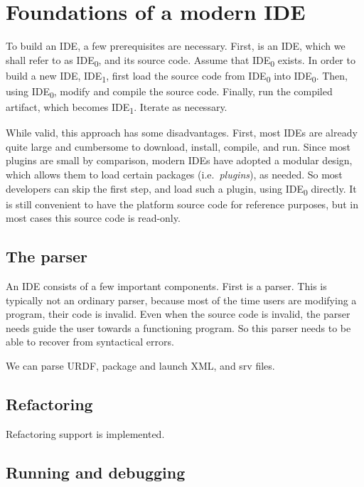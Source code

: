 \documentclass[12pt,initial,twoside,maitrise]{dms}
\numberwithin{equation}{section}
\numberwithin{table}{chapter}
\numberwithin{figure}{chapter}
\begin{document}
\section{Foundations of a modern IDE}

To build an IDE, a few prerequisites are necessary. First, is an IDE, which we shall refer to as IDE\textsubscript{0}, and its source code. Assume that IDE\textsubscript{0} exists. In order to build a new IDE, IDE\textsubscript{1}, first load the source code from IDE\textsubscript{0} into IDE\textsubscript{0}. Then, using IDE\textsubscript{0}, modify and compile the source code. Finally, run the compiled artifact, which becomes IDE\textsubscript{1}. Iterate as necessary.

While valid, this approach has some disadvantages. First, most IDEs are already quite large and cumbersome to download, install, compile, and run. Since most plugins are small by comparison, modern IDEs have adopted a modular design, which allows them to load certain packages (i.e.\ \textit{plugins}), as needed. So most developers can skip the first step, and load such a plugin, using IDE\textsubscript{0} directly. It is still convenient to have the platform source code for reference purposes, but in most cases this source code is read-only.

\subsection{The parser}

An IDE consists of a few important components. First is a parser. This is typically not an ordinary parser, because most of the time users are modifying a program, their code is invalid. Even when the source code is invalid, the parser needs guide the user towards a functioning program. So this parser needs to be able to recover from syntactical errors.

We can parse URDF, package and launch XML, and srv files.

\subsection{Refactoring}

Refactoring support is implemented.

\subsection{Running and debugging}
\end{document}
